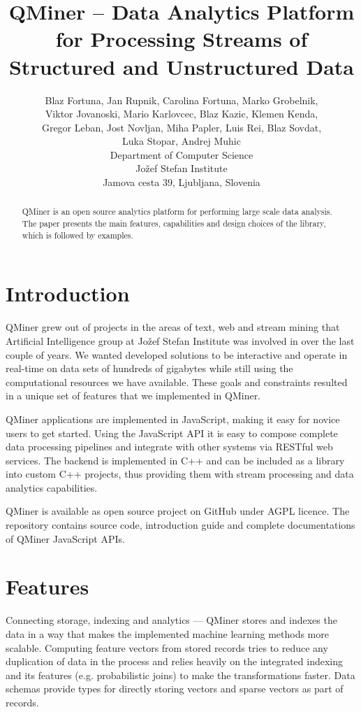 \documentclass{article} %
\title{QMiner – Data Analytics Platform for Processing Streams of Structured and Unstructured Data}
\author{
Blaz Fortuna, Jan Rupnik, Carolina Fortuna, Marko Grobelnik, \\
Viktor Jovanoski, Mario Karlovcec, Blaz Kazic, Klemen Kenda, \\
Gregor Leban, Jost Novljan, Miha Papler, Luis Rei, Blaz Sovdat, \\
Luka Stopar, Andrej Muhic \\
Department of Computer Science\\
Jožef Stefan Institute\\
Jamova cesta 39, Ljubljana, Slovenia \\
}
\begin{document}
\maketitle

\begin{abstract}
   QMiner is an open source analytics platform for performing large scale data analysis. The paper presents the main features, capabilities and design choices of the library, which is followed by examples.
\end{abstract}

\section{Introduction}
   QMiner grew out of projects in the areas of text, web and stream mining that Artificial Intelligence group at Jo\v{z}ef Stefan Institute was involved in over the last couple of years. We wanted developed solutions to be interactive and operate in real-time on data sets of hundreds of gigabytes while still using the computational resources we have available. These goals and constraints resulted in a unique set of features that we implemented in QMiner.
   
   QMiner applications are implemented in JavaScript, making it easy for novice users to get started. Using the JavaScript API it is easy to compose complete data processing pipelines and integrate with other systems via RESTful web services. The backend is implemented in C++ and can be included as a library into custom C++ projects, thus providing them with stream processing and data analytics capabilities.
   
   QMiner is available as open source project on GitHub under AGPL licence. The repository contains source code, introduction guide and complete documentations of QMiner JavaScript APIs.

\section{Features}
   Connecting storage, indexing and analytics --- QMiner stores and indexes the data in a way that makes the implemented machine learning methods more scalable. Computing feature vectors from stored records tries to reduce any duplication of data in the process and relies heavily on the integrated indexing and its features (e.g. probabilistic joins) to make the transformations faster. Data schemas provide types for directly storing vectors and sparse vectors as part of records.
   
\end{document}
